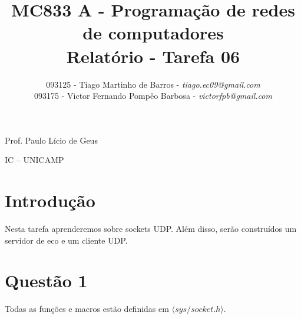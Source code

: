 \documentclass[a4paper,10pt]{article}
\begin{document}


\title{MC833 A - Programação de redes de computadores\\
Relatório - Tarefa 06}

\author {   093125 - Tiago Martinho de Barros - \textit{tiago.ec09@gmail.com}\\
            093175 - Victor Fernando Pompêo Barbosa - \textit{victorfpb@gmail.com}}


\maketitle

\centerline{Prof. Paulo Lício de Geus}
\centerline{IC -- UNICAMP}

\vspace{2cm}
\tableofcontents
    
\newpage
\section{Introdução}
\hspace{14pt}

    Nesta tarefa aprenderemos sobre sockets UDP. Além disso, serão construídos um servidor de eco e um cliente UDP. 

\section{Questão 1}

Todas as funções e macros estão definidas em $\langle sys/socket.h \rangle$.
\end{document}
